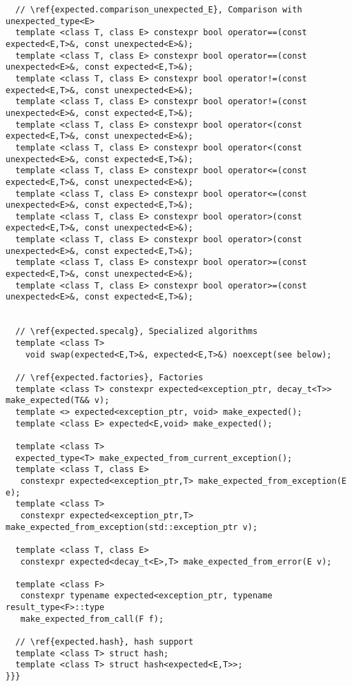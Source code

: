 \documentclass[a4paper,10pt]{article}
\begin{document}
\begin{lstlisting}
  // \ref{expected.comparison_unexpected_E}, Comparison with unexpected_type<E>
  template <class T, class E> constexpr bool operator==(const expected<E,T>&, const unexpected<E>&);
  template <class T, class E> constexpr bool operator==(const unexpected<E>&, const expected<E,T>&);
  template <class T, class E> constexpr bool operator!=(const expected<E,T>&, const unexpected<E>&);
  template <class T, class E> constexpr bool operator!=(const unexpected<E>&, const expected<E,T>&);
  template <class T, class E> constexpr bool operator<(const expected<E,T>&, const unexpected<E>&);
  template <class T, class E> constexpr bool operator<(const unexpected<E>&, const expected<E,T>&);
  template <class T, class E> constexpr bool operator<=(const expected<E,T>&, const unexpected<E>&);
  template <class T, class E> constexpr bool operator<=(const unexpected<E>&, const expected<E,T>&);
  template <class T, class E> constexpr bool operator>(const expected<E,T>&, const unexpected<E>&);
  template <class T, class E> constexpr bool operator>(const unexpected<E>&, const expected<E,T>&);
  template <class T, class E> constexpr bool operator>=(const expected<E,T>&, const unexpected<E>&);
  template <class T, class E> constexpr bool operator>=(const unexpected<E>&, const expected<E,T>&);


  // \ref{expected.specalg}, Specialized algorithms
  template <class T> 
    void swap(expected<E,T>&, expected<E,T>&) noexcept(see below);

  // \ref{expected.factories}, Factories
  template <class T> constexpr expected<exception_ptr, decay_t<T>> make_expected(T&& v);
  template <> expected<exception_ptr, void> make_expected(); 
  template <class E> expected<E,void> make_expected(); 
  
  template <class T>
  expected_type<T> make_expected_from_current_exception();
  template <class T, class E>
   constexpr expected<exception_ptr,T> make_expected_from_exception(E e); 
  template <class T>
   constexpr expected<exception_ptr,T> make_expected_from_exception(std::exception_ptr v);   
 
  template <class T, class E>
   constexpr expected<decay_t<E>,T> make_expected_from_error(E v);

  template <class F>
   constexpr typename expected<exception_ptr, typename result_type<F>::type
   make_expected_from_call(F f);

  // \ref{expected.hash}, hash support
  template <class T> struct hash;
  template <class T> struct hash<expected<E,T>>;
}}}
\end{lstlisting}
\end{document}
